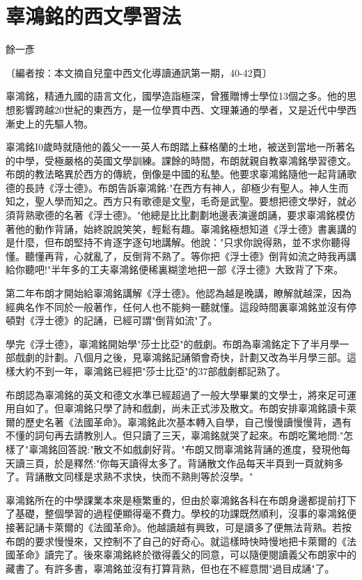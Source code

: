 
\chapter{辜鴻銘的西文學習法}

餘一彥

〔編者按：本文摘自兒童中西文化導讀通訊第一期，40-42頁〕 


辜鴻銘，精通九國的語言文化，國學造詣極深，曾獲贈博士學位13個之多。他的思想影響跨越20世紀的東西方，是一位學貫中西、文理兼通的學者，又是近代中學西漸史上的先驅人物。

辜鴻銘I0歲時就隨他的義父一一英人布朗踏上蘇格蘭的土地，被送到當地一所著名的中學，受極嚴格的英國文學訓練。課餘的時間，布朗就親自教辜鴻銘學習德文。布朗的教法略異於西方的傳統，倒像是中國的私墊。他要求辜鴻銘隨他一起背誦歌德的長詩《浮士德》。布朗告訴辜鴻銘:"在西方有神人，卻極少有聖人。神人生而知之，聖人學而知之。西方只有歌德是文聖，毛奇是武聖。要想把德文學好，就必須背熟歌德的名著《浮士德》。"他總是比比劃劃地邊表演邊朗誦，要求辜鴻銘模仿著他的動作背誦，始終說說笑笑，輕鬆有趣。辜鴻銘極想知道《浮士德》書裏講的是什麼，但布朗堅持不肯逐字逐句地講解。他說："只求你說得熟，並不求你聽得懂。聽懂再背，心就亂了，反倒背不熟了。等你把《浮士德》倒背如流之時我再講給你聽吧!"半年多的工夫辜鴻銘便稀裏糊塗地把一部《浮士德》大致背了下來。

第二年布朗才開始給辜鴻銘講解《浮士德》。他認為越是晚講，瞭解就越深，因為經典名作不同於一般著作，任何人也不能夠一聽就懂。這段時間裏辜鴻銘並沒有停頓對《浮士德》的記誦，已經可謂"倒背如流"了。

學完《浮士德》，辜鴻銘開始學"莎士比亞"的戲劇。布朗為辜鴻銘定下了半月學一部戲劇的計劃。八個月之後，見辜鴻銘記誦領會奇快，計劃又改為半月學三部。這樣大約不到一年，辜鴻銘已經把"莎士比亞"的37部戲劇都記熟了。

布朗認為辜鴻銘的英文和德文水準已經超過了一般大學畢業的文學士，將來足可運用自如了。但辜鴻銘只學了詩和戲劇，尚未正式涉及散文。布朗安排辜鴻銘讀卡萊爾的歷史名著《法國革命》。辜鴻銘此次基本轉入自學，自己慢慢讀慢慢背，遇有不懂的詞句再去請教別人。但只讀了三天，辜鴻銘就哭了起來。布朗吃驚地問:"怎樣了"辜鴻銘回答說:"散文不如戲劇好背。"布朗又問辜鴻銘背誦的進度，發現他每天讀三頁，於是釋然:"你每天讀得太多了。背誦散文作品每天半頁到一頁就夠多了。背誦散文同樣是求熟不求快，快而不熟則等於沒學。"

辜鴻銘所在的中學課業本來是極繁重的，但由於辜鴻銘各科在布朗身邊都提前打下了基礎，整個學習的過程便顯得毫不費力。學校的功課既然順利，沒事的辜鴻銘便接著記誦卡萊爾的《法國革命》。他越讀越有興致，可是讀多了便無法背熟。若按布朗的要求慢慢來，又控制不了自己的好奇心。就這樣時快時慢地把卡萊爾的《法國革命》讀完了。後來辜鴻銘終於徵得義父的同意，可以隨便閱讀義父布朗家中的藏書了。有許多書，辜鴻銘並沒有打算背熟，但也在不經意間"過目成誦"了。

